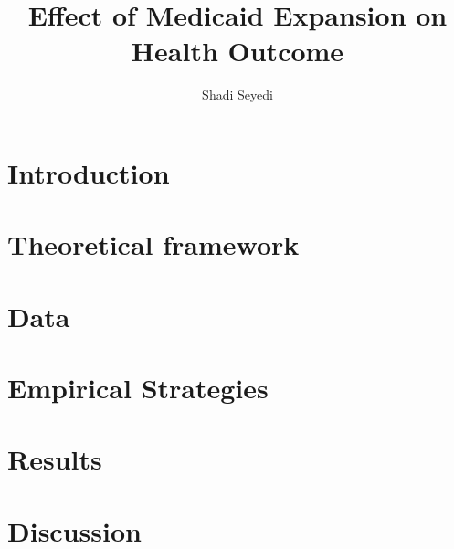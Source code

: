 \documentclass[man]{apa7}
\title{Effect of Medicaid Expansion on Health Outcome}
\author{Shadi Seyedi}
\affiliation{University of Maryland Baltimore County}
\begin{document}
\maketitle

\section{Introduction}
    
\section{Theoretical framework}
    
\section{Data}
    
\section{Empirical Strategies}
    

\section{Results}
    

\section{Discussion}
   


\printbibliography

\appendix
   
\end{document}
